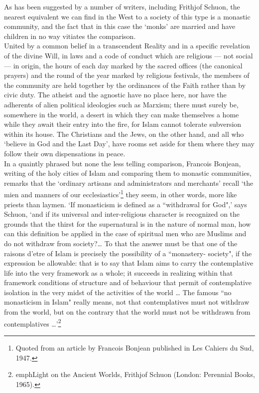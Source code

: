 \documentclass[10pt, twoside]{book}
\begin{document}
As has been suggested by a number of writers, including Frithjof Schuon, the nearest equivalent we 
can find in the West to a society of this type is a monastic community, and the fact that in this 
case the `monks' are married and have children in no way vitiates the comparison. \\

United by a common belief in a transcendent Reality and in a specific revelation of the divine Will, 
in laws and a code of conduct which are religious --- not social --- in origin, the hours of each day 
marked by the sacred offices (the canonical prayers) and the round of the year marked by religious 
festivals, the members of the community are held together by the ordinances of the Faith rather than 
by civic duty. The atheist and the agnostic have no place here, nor have the adherents of alien 
political ideologies such as Marxism; there must surely be, somewhere in the world, a desert in which 
they can make themselves a home while they await their entry into the fire, for Islam cannot tolerate 
subversion within its house. The Christians and the Jews, on the other hand, and all who `believe in 
God and the Last Day', have rooms set aside for them where they may follow their own dispensations in 
peace. \\

In a quaintly phrased but none the less telling comparison, Francois Bonjean, writing of the holy 
cities of Islam and comparing them to monastic communities, remarks that the `ordinary artisans and 
administrators and merchants' recall `the mien and manners of our ecclesiastics'\footnote{Quoted from an article by Francois Bonjean published in Les Cahiers du Sud, 1947.} they seem, in 
other words, more like priests than laymen. `If monasticism is defined as a ``withdrawal for God",' 
says Schuon, `and if its universal and inter\hyp{}religious character is recognized on the grounds that 
the thirst for the supernatural is in the nature of normal man, how can this definition be applied in 
the case of spiritual men who are Muslims and do not withdraw from society?\ldots{} To that the answer 
must be that one of the raisons d'etre of Islam is precisely the possibility of a ``monastery\hyp{}
society", if the expression be allowable: that is to say that Islam aims to carry the contemplative 
life into the very framework as a whole; it succeeds in realizing within that framework conditions of 
structure and of behaviour that permit of contemplative isolation in the very midst of the activities 
of the world \ldots{} The famous ``no monasticism in Islam" really means, not that contemplatives must not 
withdraw from the world, but on the contrary that the world must not be withdrawn from contemplatives 
\ldots{}'\footnote{emph{Light on the Ancient Worlds}, Frithjof Schuon (London: Perennial Books, 1965).}
\end{document}
